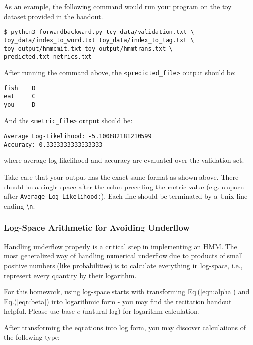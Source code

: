 \documentclass[11pt,addpoints,answers]{exam}
\begin{document}
As an example, the following command would run your program on the toy dataset provided in the handout.
\begin{lstlisting}
$ python3 forwardbackward.py toy_data/validation.txt \ 
toy_data/index_to_word.txt toy_data/index_to_tag.txt \
toy_output/hmmemit.txt toy_output/hmmtrans.txt \
predicted.txt metrics.txt
\end{lstlisting}

After running the command above, the \texttt{<predicted\_file>} output should be:

\begin{lstlisting}
fish	D
eat 	C
you 	D

\end{lstlisting}

\clearpage
And the \texttt{<metric\_file>} output should be:

\begin{lstlisting}
Average Log-Likelihood: -5.100082181210599
Accuracy: 0.3333333333333333
\end{lstlisting}

where average log-likelihood and accuracy are evaluated over the validation set.

Take care that your output has the exact same format as shown above. There should be a single space after the colon preceding the metric value (e.g. a space after \lstinline{Average Log-Likelihood:}). Each line should be terminated by a Unix line ending \lstinline{\n}.

\subsubsection{Log-Space Arithmetic for Avoiding Underflow}
\label{sec:underflow}

Handling underflow properly is a critical step in implementing an HMM. The most generalized way of handling numerical underflow due to products of small positive numbers (like probabilities) is to calculate everything in log-space, i.e., represent every quantity by their logarithm. 

For this homework, using log-space starts with transforming Eq.(\ref{eqn:alpha}) and Eq.(\ref{eqn:beta}) into logarithmic form - you may find the recitation handout helpful. Please use base $e$ (natural log) for logarithm calculation.

After transforming the equations into log form, you may discover calculations of the following type:
\end{document}
